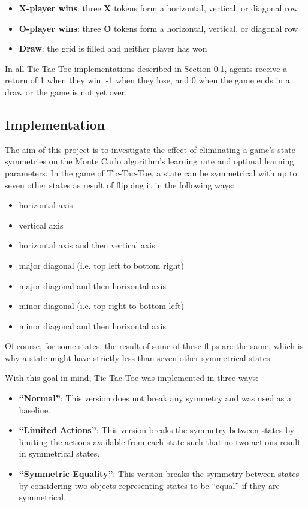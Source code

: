 \documentclass[11pt,a4paper]{report}
\begin{document}
\begin{itemize}
	\item \textbf{X-player wins}: three \textbf{X} tokens form a horizontal, vertical, or diagonal row
	\item \textbf{O-player wins}: three \textbf{O} tokens form a horizontal, vertical, or diagonal row
	\item \textbf{Draw}: the grid is filled and neither player has won
\end{itemize}

In all Tic-Tac-Toe implementations described in Section \ref{sec:TicTacToeImplementation}, agents receive a return of 1 when they win, -1 when they lose, and 0 when the game ends in a draw or the game is not yet over.


\subsection{Implementation}
\label{sec:TicTacToeImplementation}

The aim of this project is to investigate the effect of eliminating a game's state symmetries on the Monte Carlo algorithm's learning rate and optimal learning parameters. In the game of Tic-Tac-Toe, a state can be symmetrical with up to seven other states as result of flipping it in the following ways:

\begin{itemize}
	\item horizontal axis
	\item vertical axis
	\item horizontal axis and then vertical axis
	\item major diagonal (i.e. top left to bottom right)
	\item major diagonal and then horizontal axis
	\item minor diagonal (i.e. top right to bottom left)
	\item minor diagonal and then horizontal axis
\end{itemize}

Of course, for some states, the result of some of these flips are the same, which is why a state might have strictly less than seven other symmetrical states.

With this goal in mind, Tic-Tac-Toe was implemented in three ways:

\begin{itemize}

	\item \textbf{``Normal''}:
This version does not break any symmetry and was used as a baseline.

	\item \textbf{``Limited Actions''}:
This version breaks the symmetry between states by limiting the actions available from each state such that no two actions result in symmetrical states.

	\item \textbf{``Symmetric Equality''}: 
This version breaks the symmetry between states by considering two objects representing states to be ``equal'' if they are symmetrical.

\end{itemize}
\end{document}
